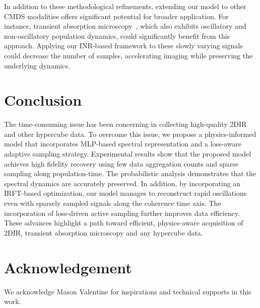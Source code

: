 \documentclass{optica-article}
\begin{document}
In addition to these methodological refinements, extending our model to other CMDS modalities offers significant potential for broader application. For instance, transient absorption microscopy~\cite{zhu2020transient, gross2023progress}, which also exhibits oscillatory and non-oscillatory population dynamics, could significantly benefit from this approach. Applying our INR-based framework to these slowly varying signals could decrease the number of samples, accelerating imaging while preserving the underlying dynamics.
%
\section{Conclusion}

The time-consuming issue has been concerning in collecting high-quality 2DIR and other hypercube data. To overcome this issue, we propose a physics-informed model that incorporates MLP-based spectral representation and a loss-aware adaptive sampling strategy. Experimental results show that the proposed model achieves high fidelity recovery using few data aggregation counts and sparse sampling along population-time. The probabilistic analysis demonstrates that the spectral dynamics are accurately preserved. In addition, by incorporating an IRFT-based optimization, our model manages to reconstruct rapid oscillations even with sparsely sampled signals along the coherence time axis. The incorporation of loss-driven active sampling further improves data efficiency. These advances highlight a path toward efficient, physics-aware acquisition of 2DIR, transient absorption microscopy and any hypercube data.

\section{Acknowledgement}

We acknowledge Mason Valentine for inspirations and technical supports in this work.
% 
\end{document}
